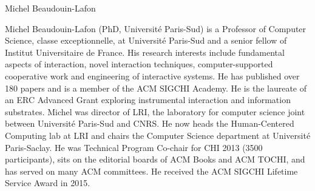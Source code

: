 \begin{participant}[type=PI,PM=1,gender=male]{Michel Beaudouin-Lafon}

Michel Beaudouin-Lafon (PhD, Université Paris-Sud) is a Professor of Computer Science, classe exceptionnelle, 
at Université Paris-Sud and a senior fellow of Institut Universitaire de France. 
His research interests include fundamental aspects of interaction, novel interaction techniques, 
computer-supported cooperative work and engineering of interactive systems. 
He has published over 180 papers and is a member of the ACM SIGCHI Academy. 
He is the laureate of an ERC Advanced Grant exploring instrumental interaction and information substrates. 
Michel was director of LRI, the laboratory for computer science joint between Université Paris-Sud and CNRS. 
He now heads the Human-Centered Computing lab at LRI and chairs the Computer Science department at Université Paris-Saclay. 
He was Technical Program Co-chair for CHI 2013 (3500 participants), sits on the editorial boards of ACM Books and ACM TOCHI, 
and has served on many ACM committees. He received the ACM SIGCHI Lifetime Service Award in 2015.

\end{participant}

